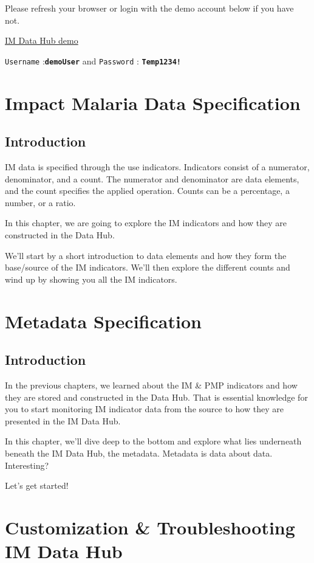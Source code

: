\documentclass[]{book}
\begin{document}
Please refresh your browser or login with the demo account below if you have not.

\begin{FOO}
\href{https://im-dev.psi-mis.org/dhis-web-dataentry/index.action}{IM
Data Hub demo}

\texttt{Username} :\textbf{\texttt{demoUser}} and \texttt{Password} :
\textbf{\texttt{Temp1234!}}
\end{FOO}

\hypertarget{data}{%
\chapter{Impact Malaria Data Specification}\label{data}}

\hypertarget{introduction-1}{%
\section{Introduction}\label{introduction-1}}

IM data is specified through the use indicators. Indicators consist of a numerator, denominator, and a count. The numerator and denominator are data elements, and the count specifies the applied operation. Counts can be a percentage, a number, or a ratio.

In this chapter, we are going to explore the IM indicators and how they are constructed in the Data Hub.

We'll start by a short introduction to data elements and how they form the base/source of the IM indicators. We'll then explore the different counts and wind up by showing you all the IM indicators.

\hypertarget{meta}{%
\chapter{Metadata Specification}\label{meta}}

\hypertarget{introduction-2}{%
\section{Introduction}\label{introduction-2}}

In the previous chapters, we learned about the IM \& PMP indicators and how they are stored and constructed in the Data Hub. That is essential knowledge for you to start monitoring IM indicator data from the source to how they are presented in the IM Data Hub.

In this chapter, we'll dive deep to the bottom and explore what lies underneath beneath the IM Data Hub, the metadata. Metadata is data about data. Interesting?

Let's get started!

\hypertarget{customization-troubleshooting-im-data-hub}{%
\chapter{Customization \& Troubleshooting IM Data Hub}\label{customization-troubleshooting-im-data-hub}}


\end{document}

